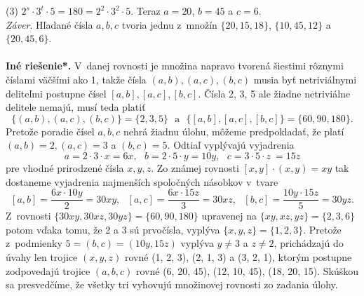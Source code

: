 {(3) $2^s \cdot 3^t \cdot 5 = 180 = 2^2 \cdot 3^2 \cdot 5$. Teraz $a = 20$, $b = 45$ a $c = 6$.\\
\textit{Záver}. Hľadané čísla $a, b, c$ tvoria jednu z~množín $\{20, 15, 18\}$, $\{10, 45, 12\}$ a $\{20, 45, 6\}$.\\
\\
\textbf{Iné riešenie*.} V~danej rovnosti je množina napravo tvorená šiestimi rôznymi číslami väčšími ako 1, takže čísla $(a, b), (a, c), (b, c)$ musia byť netriviálnymi deliteľmi postupne čísel $[a, b], [a, c], [b, c]$. Čísla 2, 3, 5 ale žiadne netriviálne delitele nemajú, musí teda platiť
$$\{(a, b), (a, c), (b, c)\}= \{2, 3, 5\} \ \ \ \text{a} \ \ \  \{[a, b], [a, c], [b, c]\} = \{60, 90, 180\}.$$
Pretože poradie čísel $a, b, c$ nehrá žiadnu úlohu, môžeme predpokladať, že platí $(a, b) = 2, (a, c) = 3$ a $(b, c) = 5$. Odtiaľ vyplývajú vyjadrenia
$$a = 2 \cdot 3 \cdot x = 6x, \ \ \ b = 2 \cdot 5 \cdot y = 10y, \ \ \ c = 3 \cdot 5 \cdot z~= 15z$$
pre vhodné prirodzené čísla $x, y, z$. Zo známej rovnosti $[x, y]\cdot(x, y) = xy$ tak dostaneme vyjadrenia najmenších spoločných násobkov v~tvare
$$[a, b] =\frac{6x \cdot 10y}{2}= 30xy, \ \ \ [a, c] =\frac{6x \cdot 15z}{3}= 30xz,\ \ \  [b, c] =\frac{10y \cdot 15z}{5}= 30yz.$$
Z~rovnosti $\{30xy, 30xz, 30yz\} = \{60, 90, 180\}$ upravenej na $\{xy, xz, yz\} = \{2, 3, 6\}$ potom vďaka tomu, že 2 a 3 sú prvočísla, vyplýva $\{x, y, z\} = \{1, 2, 3\}$. Pretože z~podmienky $5 = (b, c) = (10y, 15z)$ vyplýva $y \neq 3$ a $z \neq 2$, prichádzajú do úvahy len trojice $(x, y, z)$ rovné (1, 2, 3), (2, 1, 3) a (3, 2, 1), ktorým postupne zodpovedajú trojice $(a, b, c)$ rovné (6, 20, 45), (12, 10, 45), (18, 20, 15). Skúškou sa presvedčíme, že všetky tri vyhovujú množinovej rovnosti zo zadania úlohy.\\
\\
}

